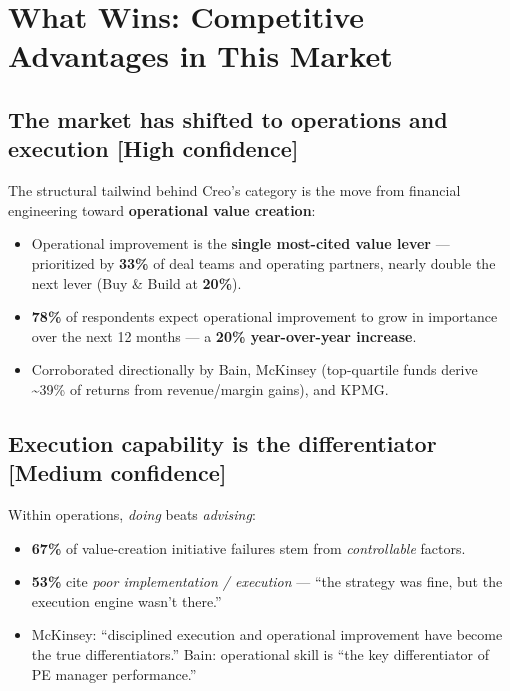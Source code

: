 \documentclass[11pt]{article}
\newcommand{\high}{\textcolor{green!45!black}{\textbf{[High confidence]}}}
\newcommand{\medium}{\textcolor{orange!80!black}{\textbf{[Medium confidence]}}}
\begin{document}
\section{What Wins: Competitive Advantages in This Market}

\subsection{The market has shifted to operations and execution \high}
The structural tailwind behind Creo's category is the move from financial
engineering toward \textbf{operational value creation}:

\begin{itemize}
  \item Operational improvement is the \textbf{single most-cited value lever} ---
  prioritized by \textbf{33\%} of deal teams and operating partners, nearly
  double the next lever (Buy \& Build at \textbf{20\%}).
  \item \textbf{78\%} of respondents expect operational improvement to grow in
  importance over the next 12 months --- a \textbf{20\% year-over-year increase}.
  \item Corroborated directionally by Bain, McKinsey (top-quartile funds derive
  \textasciitilde{}39\% of returns from revenue/margin gains), and KPMG.
\end{itemize}

\subsection{Execution capability is the differentiator \medium}
Within operations, \emph{doing} beats \emph{advising}:

\begin{itemize}
  \item \textbf{67\%} of value-creation initiative failures stem from
  \emph{controllable} factors.
  \item \textbf{53\%} cite \emph{poor implementation / execution} ---
  ``the strategy was fine, but the execution engine wasn't there.''
  \item McKinsey: ``disciplined execution and operational improvement have
  become the true differentiators.'' Bain: operational skill is ``the key
  differentiator of PE manager performance.''
\end{itemize}
\end{document}
